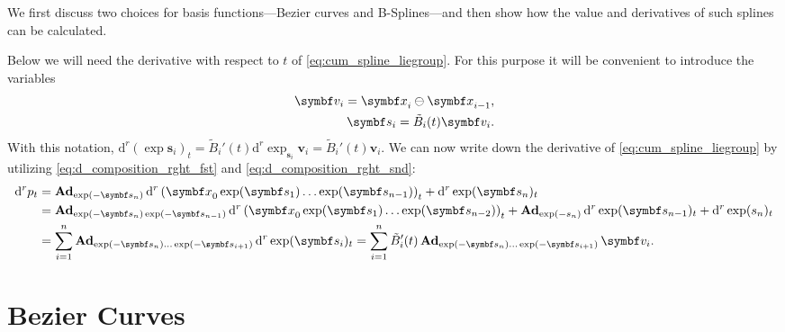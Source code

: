 We first discuss two choices for basis functions---Bezier curves and B-Splines---and then show how the value and derivatives of such splines can be calculated.

Below we will need the derivative with respect to $t$ of \eqref{eq:cum_spline_liegroup}. For this purpose it will be convenient to introduce the variables
\begin{equation}
  \begin{aligned}
    \symbf v_{i} = \x_{i} \ominus \x_{i-1}, \\
    \symbf s_{i} = \tilde B_{i}(t) \symbf v_{i}.
  \end{aligned}
\end{equation}
With this notation, $\mathrm{d}^{r} \left( \exp \symbf s_{i} \right)_{t} = \tilde B_{i}'(t) \mathrm{d}^{r} \exp_{\symbf s_{i}} \symbf v_{i} = \tilde B_{i}'(t) \symbf v_{i}$. We can now write down the derivative of \eqref{eq:cum_spline_liegroup} by utilizing \eqref{eq:d_composition_rght_fst} and \eqref{eq:d_composition_rght_snd}:
\begin{equation}
  \label{eq:cum_spline_liegroup_deriv}
  \begin{aligned}
    \mathrm{d}^{r} p_{t} & = \bAd_{\exp(-\symbf s_{n})} \mathrm{d}^{r} \left( \x_{0} \exp(\symbf s_{1})  \ldots \exp(\symbf s_{n-1})\right)_{t} + \mathrm{d}^{r} \exp (\symbf s_{n})_{t}                                                                              \\
                         & = \bAd_{\exp(-\symbf s_{n}) \exp(-\symbf s_{n-1})} \mathrm{d}^{r} \left( \x_{0} \exp(\symbf s_{1})  \ldots \exp(\symbf s_{n-2})\right)_{t} + \bAd_{\exp(-s_{n})} \mathrm{d}^{r} \exp (\symbf s_{n-1})_{t} + \mathrm{d}^{r} \exp(s_{n})_{t} \\
                         & = \sum_{i=1}^{n} \bAd_{\exp(-\symbf s_{n}) \ldots \exp(-\symbf s_{i+1})} \mathrm{d}^{r} \exp (\symbf s_{i})_{t} = \sum_{i=1}^{n} \tilde B_{i}'(t) \bAd_{\exp(-\symbf s_{n}) \ldots \exp(-\symbf s_{i+1})} \symbf v_{i}.
  \end{aligned}
\end{equation}

\section{Bezier Curves}

